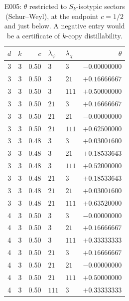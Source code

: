 \begin{table}[h]\centering
\caption{E005: $\theta$ restricted to $S_k$-isotypic sectors (Schur--Weyl), at the endpoint $c=1/2$ and just below. A negative entry would be a certificate of $k$-copy distillability.}\label{tab:iso}
{\setlength{\tabcolsep}{8pt}\renewcommand{\arraystretch}{1.2}
\begin{tabular}{rrrllr}\toprule
$d$ & $k$ & $c$ & $\lambda_\psi$ & $\lambda_\chi$ & $\theta$ \\\midrule
3 & 3 & 0.50 & $3$ & $3$ & $-0.00000000$ \\
3 & 3 & 0.50 & $3$ & $2  1$ & $+0.16666667$ \\
3 & 3 & 0.50 & $3$ & $1  1  1$ & $+0.50000000$ \\
3 & 3 & 0.50 & $2  1$ & $3$ & $+0.16666667$ \\
3 & 3 & 0.50 & $2  1$ & $2  1$ & $-0.00000000$ \\
3 & 3 & 0.50 & $2  1$ & $1  1  1$ & $+0.62500000$ \\
3 & 3 & 0.48 & $3$ & $3$ & $+0.03001600$ \\
3 & 3 & 0.48 & $3$ & $2  1$ & $+0.18533643$ \\
3 & 3 & 0.48 & $3$ & $1  1  1$ & $+0.52000000$ \\
3 & 3 & 0.48 & $2  1$ & $3$ & $+0.18533643$ \\
3 & 3 & 0.48 & $2  1$ & $2  1$ & $+0.03001600$ \\
3 & 3 & 0.48 & $2  1$ & $1  1  1$ & $+0.63520000$ \\
4 & 3 & 0.50 & $3$ & $3$ & $-0.00000000$ \\
4 & 3 & 0.50 & $3$ & $2  1$ & $+0.16666667$ \\
4 & 3 & 0.50 & $3$ & $1  1  1$ & $+0.33333333$ \\
4 & 3 & 0.50 & $2  1$ & $3$ & $+0.16666667$ \\
4 & 3 & 0.50 & $2  1$ & $2  1$ & $-0.00000000$ \\
4 & 3 & 0.50 & $2  1$ & $1  1  1$ & $+0.50000000$ \\
4 & 3 & 0.50 & $1  1  1$ & $3$ & $+0.33333333$ \\
\bottomrule\end{tabular}}
\end{table}
